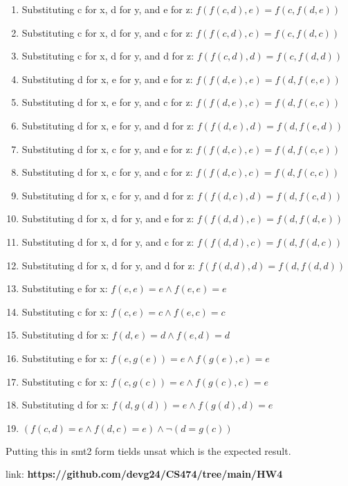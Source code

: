 \documentclass[12pt]{article}
\begin{document}
\begin{enumerate}
    \item Substituting c for x, d for y, and e for z:
    $f(f(c,d),e) = f(c,f(d,e))$
    
    \item Substituting c for x, d for y, and c for z:
    $f(f(c,d),c) = f(c,f(d,c))$
    
    \item Substituting c for x, d for y, and d for z:
    $f(f(c,d),d) = f(c,f(d,d))$
    
    \item Substituting d for x, e for y, and e for z:
    $f(f(d,e),e) = f(d,f(e,e))$
    
    \item Substituting d for x, e for y, and c for z:
    $f(f(d,e),c) = f(d,f(e,c))$
    
    \item Substituting d for x, e for y, and d for z:
    $f(f(d,e),d) = f(d,f(e,d))$
    
    \item Substituting d for x, c for y, and e for z:
    $f(f(d,c),e) = f(d,f(c,e))$
    
    \item Substituting d for x, c for y, and c for z:
    $f(f(d,c),c) = f(d,f(c,c))$
    
    \item Substituting d for x, c for y, and d for z:
    $f(f(d,c),d) = f(d,f(c,d))$
    
    \item Substituting d for x, d for y, and e for z:
    $f(f(d,d),e) = f(d,f(d,e))$

    \item Substituting d for x, d for y, and c for z:
    $f(f(d,d),c) = f(d,f(d,c))$

    \item Substituting d for x, d for y, and d for z:
    $f(f(d,d),d) = f(d,f(d,d))$

    \item Substituting e for x:
    $f(e,e) = e \land f(e,e) = e$
    
    \item Substituting c for x:
    $f(c,e) = c \land f(e,c) = c$
    
    \item Substituting d for x:
    $f(d,e) = d \land f(e,d) = d$
    
    \item Substituting e for x:
    $f(e, g(e)) = e \land f(g(e),e) = e$

    \item Substituting c for x:
    $f(c, g(c)) = e \land f(g(c),c) = e$

    \item Substituting d for x:
    $f(d, g(d)) = e \land f(g(d),d) = e$

    \item $(f(c,d) = e \land f(d,c) = e) \land \neg(d = g(c))$
    
\end{enumerate}

Putting this in smt2 form tields unsat which is the expected result.

link: \textbf{https://github.com/devg24/CS474/tree/main/HW4}
\end{document}
